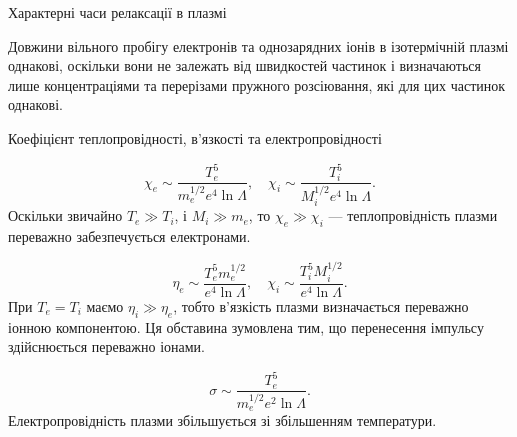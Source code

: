 \documentclass[]{beamer}
\begin{document}
\begin{frame}{Характерні часи релаксації в плазмі}{}
\begin{onlyenv}
\begin{block}{}
			Довжини вільного пробігу електронів та однозарядних іонів в ізотермічній плазмі однакові, оскільки вони не залежать від швидкостей
			частинок і визначаються лише концентраціями та перерізами пружного розсіювання, які для цих частинок однакові.

		\end{block}
	\end{onlyenv}
\end{frame}

\begin{frame}{Коефіцієнт теплопровідності, в'язкості та електропровідності}{}
	\begin{block}{}\justifying
		\begin{equation*}
			\chi_e \sim \frac{T_e^5}{m_e^{1/2}e^4\ln\Lambda}, \quad \chi_i \sim \frac{T_i^5}{M_i^{1/2}e^4\ln\Lambda}.
		\end{equation*}
		Оскільки звичайно $T_e \gg T_i$, і $M_i \gg m_e$, то $\chi_e \gg \chi_i$ --- \alert{теплопровідність плазми переважно забезпечується
			електронами}.
	\end{block}

	\begin{block}{}\justifying
		\begin{equation*}
			\eta_e \sim \frac{T_e^5m_e^{1/2}}{e^4\ln\Lambda}, \quad \chi_i \sim \frac{T_i^5M_i^{1/2}}{e^4\ln\Lambda}.
		\end{equation*}
		При $T_e = T_i$ маємо $\eta_i \gg \eta_e$,	тобто \alert{в'язкість плазми визначається переважно іонною компонентою}. Ця обставина
		зумовлена тим, що перенесення імпульсу здійснюється переважно іонами.
	\end{block}

	\begin{block}{}\justifying
		\begin{equation*}
			\sigma \sim \frac{T_e^5}{m_e^{1/2} e^2\ln\Lambda}.
		\end{equation*}
		Електропровідність плазми збільшується зі збільшенням температури.
	\end{block}
\end{frame}
\end{document}

